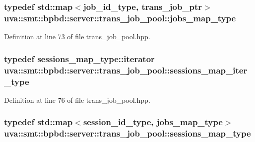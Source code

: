 \subsubsection[{jobs\+\_\+map\+\_\+type}]{\setlength{\rightskip}{0pt plus 5cm}typedef std\+::map$<${\bf job\+\_\+id\+\_\+type}, {\bf trans\+\_\+job\+\_\+ptr}$>$ {\bf uva\+::smt\+::bpbd\+::server\+::trans\+\_\+job\+\_\+pool\+::jobs\+\_\+map\+\_\+type}}\label{classuva_1_1smt_1_1bpbd_1_1server_1_1trans__job__pool_a3fec3b5759e5296106b61143a5d229b2}


Definition at line 73 of file trans\+\_\+job\+\_\+pool.\+hpp.

\hypertarget{classuva_1_1smt_1_1bpbd_1_1server_1_1trans__job__pool_ac5e725580da6d0e9b4179f6be1c4770d}{}
\subsubsection[{sessions\+\_\+map\+\_\+iter\+\_\+type}]{\setlength{\rightskip}{0pt plus 5cm}typedef sessions\+\_\+map\+\_\+type\+::iterator {\bf uva\+::smt\+::bpbd\+::server\+::trans\+\_\+job\+\_\+pool\+::sessions\+\_\+map\+\_\+iter\+\_\+type}}\label{classuva_1_1smt_1_1bpbd_1_1server_1_1trans__job__pool_ac5e725580da6d0e9b4179f6be1c4770d}


Definition at line 76 of file trans\+\_\+job\+\_\+pool.\+hpp.

\hypertarget{classuva_1_1smt_1_1bpbd_1_1server_1_1trans__job__pool_aa82f73de4939af58fc6e0c819c647469}{}
\subsubsection[{sessions\+\_\+map\+\_\+type}]{\setlength{\rightskip}{0pt plus 5cm}typedef std\+::map$<${\bf session\+\_\+id\+\_\+type}, {\bf jobs\+\_\+map\+\_\+type}$>$ {\bf uva\+::smt\+::bpbd\+::server\+::trans\+\_\+job\+\_\+pool\+::sessions\+\_\+map\+\_\+type}}\label{classuva_1_1smt_1_1bpbd_1_1server_1_1trans__job__pool_aa82f73de4939af58fc6e0c819c647469}


